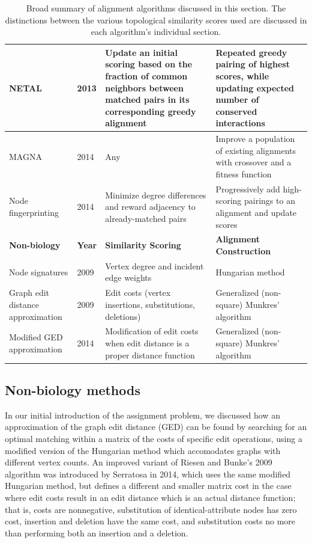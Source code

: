 \documentclass[12pt]{thesis}
\theoremstyle{plain}
\theoremstyle{definition}
\theoremstyle{remark}
\begin{document}
\begin{table}[!hp]
{\begin{tabular}{|L{0.2\textwidth}|L{0.055\textwidth}|L{0.33\textwidth}|L{0.31\textwidth}|}
NETAL \cite{Neyshabur_2013} & 2013 & Update an initial scoring based on the fraction of common neighbors between matched pairs in its corresponding greedy alignment & Repeated greedy pairing of highest scores, while updating expected number of conserved interactions \\ \hline

MAGNA \cite{Saraph_2014} & 2014 & Any & Improve a population of existing alignments with crossover and a fitness function \\ \hline

Node fingerprinting \cite{radu2014node} & 2014 & Minimize degree differences and reward adjacency to already-matched pairs & Progressively add high-scoring pairings to an alignment and update scores\\ \hline \hline

\textbf{Non-biology}  & \textbf{Year} & \textbf{Similarity Scoring} & \textbf{Alignment Construction} \\ \hline\hline

Node signatures \cite{Jouili_2009} & 2009 & Vertex degree and incident edge weights & Hungarian method \\ \hline

Graph edit distance approximation \cite{Riesen_2009} & 2009 & Edit costs (vertex insertions, substitutions, deletions) & Generalized (non-square) Munkres' algorithm \\ \hline
Modified GED approximation \cite{Serratosa_2014} & 2014 & Modification of edit costs when edit distance is a proper distance function & Generalized (non-square) Munkres' algorithm \\ \hline 
\end{tabular}
}
\caption{Broad summary of alignment algorithms discussed in this section. The distinctions between the various topological similarity scores used are discussed in each algorithm's individual section.}
\label{tab:alignment_algorithms}
\end{table}

\subsection{Non-biology methods}

In our initial introduction of the assignment problem, we discussed how an approximation of the graph edit distance (GED) can be found by searching for an optimal matching within a matrix of the costs of specific edit operations, using a modified version of the Hungarian method \cite{Riesen_2009} which accomodates graphs with different vertex counts. An improved variant of Riesen and Bunke's 2009 algorithm was introduced by Serratosa in 2014, which uses the same modified Hungarian method, but defines a different and smaller matrix cost in the case where edit costs result in an edit distance which is an actual distance function; that is, costs are nonnegative, substitution of identical-attribute nodes has zero cost, insertion and deletion have the same cost, and substitution costs no more than performing both an insertion and a deletion.
\end{document}
